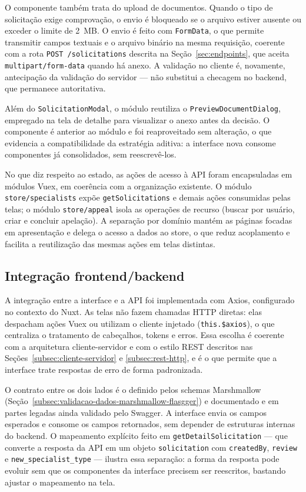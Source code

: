 O componente também trata do upload de documentos. Quando o tipo de solicitação exige
comprovação, o envio é bloqueado se o arquivo estiver ausente ou exceder o limite de
2~MB. O envio é feito com \texttt{FormData}, o que permite transmitir campos textuais e
o arquivo binário na mesma requisição, coerente com a rota \texttt{POST /solicitations}
descrita na Seção~\ref{sec:endpoints}, que aceita \texttt{multipart/form-data} quando há anexo. A
validação no cliente é, novamente, antecipação da validação do servidor --- não
substitui a checagem no backend, que permanece autoritativa.

Além do \texttt{SolicitationModal}, o módulo reutiliza o \texttt{PreviewDocumentDialog},
empregado na tela de detalhe para visualizar o anexo antes da decisão. O componente é
anterior ao módulo e foi reaproveitado sem alteração, o que evidencia a compatibilidade
da estratégia aditiva: a interface nova consome componentes já consolidados, sem
reescrevê-los.

No que diz respeito ao estado, as ações de acesso à API foram encapsuladas em módulos Vuex, em
coerência com a organização existente. O módulo \texttt{store/specialists} expõe
\texttt{getSolicitations} e demais ações consumidas pelas telas; o módulo \texttt{store/appeal}
isola as operações de recurso (buscar por usuário, criar e concluir apelação). A separação por
domínio mantém as páginas focadas em apresentação e delega o acesso a dados ao store, o que
reduz acoplamento e facilita a reutilização das mesmas ações em telas distintas.

\subsection{Integração frontend/backend}
\label{subsec:integracao-frontend-backend}

A integração entre a interface e a API foi implementada com Axios, configurado no
contexto do Nuxt. As telas não fazem chamadas HTTP diretas: elas despacham ações Vuex ou
utilizam o cliente injetado (\texttt{this.\$axios}), o que centraliza o tratamento de
cabeçalhos, tokens e erros. Essa escolha é coerente com a arquitetura cliente-servidor e
com o estilo REST descritos nas Seções~\ref{subsec:cliente-servidor} e
\ref{subsec:rest-http}, e é o que permite que a interface
trate respostas de erro de forma padronizada.

O contrato entre os dois lados é o definido pelos schemas Marshmallow (Seção~\ref{subsec:validacao-dados-marshmallow-flasgger}) e
documentado e em partes legadas ainda validado pelo Swagger. A interface envia os campos 
esperados e consome os campos retornados, sem depender de estruturas internas do backend. 
O mapeamento explícito feito em \texttt{getDetailSolicitation} --- que converte a resposta da API em um objeto
\texttt{solicitation} com \texttt{createdBy}, \texttt{review} e \texttt{new\_specialist\_type}
--- ilustra essa separação: a forma da resposta pode evoluir sem que os componentes da interface
precisem ser reescritos, bastando ajustar o mapeamento na tela.

